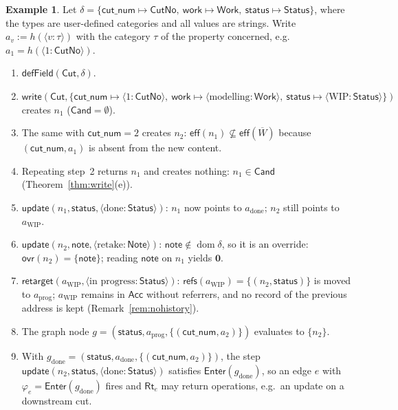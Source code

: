 \documentclass[11pt,a4paper]{article}
\theoremstyle{definition}
\newtheorem{example}[definition]{Example}
\theoremstyle{plain}
\theoremstyle{remark}
\newcommand{\nul}{\mathbf{0}}
\newcommand{\dom}{\operatorname{dom}}
\newcommand{\eff}{\mathsf{eff}}
\newcommand{\ovr}{\mathsf{ovr}}
\newcommand{\refs}{\mathsf{refs}}
\newcommand{\Acc}{\mathsf{Acc}}
\newcommand{\Cand}{\mathsf{Cand}}
\newcommand{\Enter}{\mathsf{Enter}}
\newcommand{\datum}[2]{\langle #1\!:\!#2\rangle}
\begin{document}
\begin{example}\label{ex:main}
Let $\delta=\{\mathsf{cut\_num}\mapsto\mathsf{CutNo},\ \mathsf{work}\mapsto\mathsf{Work},\ \mathsf{status}\mapsto\mathsf{Status}\}$, where the types are user-defined categories and all values are strings.
Write $a_{v}:=h(\datum{v}{\tau})$ with the category $\tau$ of the property concerned, e.g.\ $a_1=h(\datum{1}{\mathsf{CutNo}})$.
\begin{enumerate}[label=\arabic*.,leftmargin=*]
\item $\textsf{defField}(\mathsf{Cut},\delta)$.
\item $\textsf{write}(\mathsf{Cut},\{\mathsf{cut\_num}\mapsto\datum{1}{\mathsf{CutNo}},\ \mathsf{work}\mapsto\datum{\text{modelling}}{\mathsf{Work}},\ \mathsf{status}\mapsto\datum{\text{WIP}}{\mathsf{Status}}\})$ creates $n_1$ ($\Cand=\emptyset$).
\item The same with $\mathsf{cut\_num}=2$ creates $n_2$: $\eff(n_1)\not\subseteq\eff(\overline W)$ because $(\mathsf{cut\_num},a_1)$ is absent from the new content.
\item Repeating step~2 returns $n_1$ and creates nothing: $n_1\in\Cand$ (Theorem~\ref{thm:write}(e)).
\item $\textsf{update}(n_1,\mathsf{status},\datum{\text{done}}{\mathsf{Status}})$: $n_1$ now points to $a_{\mathrm{done}}$; $n_2$ still points to $a_{\mathrm{WIP}}$.
\item $\textsf{update}(n_2,\mathsf{note},\datum{\text{retake}}{\mathsf{Note}})$: $\mathsf{note}\notin\dom\delta$, so it is an override: $\ovr(n_2)=\{\mathsf{note}\}$; reading $\mathsf{note}$ on $n_1$ yields $\nul$.
\item $\textsf{retarget}(a_{\mathrm{WIP}},\datum{\text{in progress}}{\mathsf{Status}})$: $\refs(a_{\mathrm{WIP}})=\{(n_2,\mathsf{status})\}$ is moved to $a_{\mathrm{prog}}$; $a_{\mathrm{WIP}}$ remains in $\Acc$ without referrers, and no record of the previous address is kept (Remark~\ref{rem:nohistory}).
\item The graph node $g=(\mathsf{status},a_{\mathrm{prog}},\{(\mathsf{cut\_num},a_2)\})$ evaluates to $\{n_2\}$.
\item With $g_{\mathrm{done}}=(\mathsf{status},a_{\mathrm{done}},\{(\mathsf{cut\_num},a_2)\})$, the step $\textsf{update}(n_2,\mathsf{status},\datum{\text{done}}{\mathsf{Status}})$
satisfies $\Enter(g_{\mathrm{done}})$, so an edge $e$ with $\varphi_e=\Enter(g_{\mathrm{done}})$ fires and $\mathsf{Rt}_e$ may return operations, e.g.\ an \textsf{update} on a downstream cut.
\end{enumerate}
\end{example}
\end{document}
